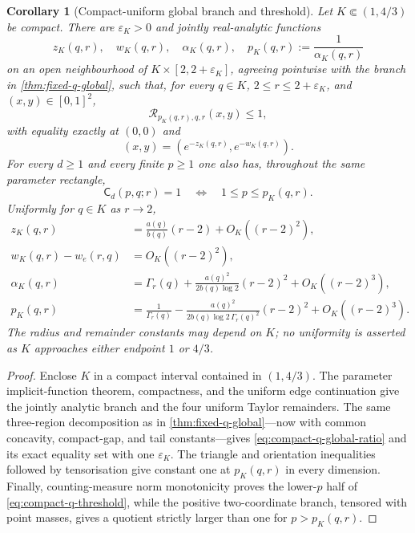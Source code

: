 \documentclass[11pt,reqno]{amsart}
\numberwithin{equation}{section}
\newtheorem{corollary}[corollary]{Corollary}
\theoremstyle{definition}
\theoremstyle{remark}
\newcommand{\Cpqr}{\mathsf C}
\begin{document}
\begin{corollary}[Compact-uniform global branch and threshold]
\label{cor:compact-q-global}
Let $K\Subset(1,4/3)$ be compact.  There are $\varepsilon_K>0$ and jointly
real-analytic functions
\[
  z_K(q,r),\quad w_K(q,r),\quad \alpha_K(q,r),\quad
  p_K(q,r):=\frac1{\alpha_K(q,r)}
\]
on an open neighbourhood of $K\times[2,2+\varepsilon_K]$, agreeing pointwise
with the branch in \cref{thm:fixed-q-global}, such that, for every $q\in K$,
$2\le r\le2+\varepsilon_K$, and $(x,y)\in[0,1]^2$,
\begin{equation}\label{eq:compact-q-global-ratio}
  \mathcal R_{p_K(q,r),q,r}(x,y)\le1,
\end{equation}
with equality exactly at $(0,0)$ and
\[
  (x,y)=\left(e^{-z_K(q,r)},e^{-w_K(q,r)}\right).
\]
For every $d\ge1$ and every finite $p\ge1$ one also has, throughout the same
parameter rectangle,
\begin{equation}\label{eq:compact-q-threshold}
  \Cpqr_d(p,q;r)=1
  \quad\Longleftrightarrow\quad
  1\le p\le p_K(q,r).
\end{equation}
Uniformly for $q\in K$ as $r\to2$,
\begin{align}
  z_K(q,r)
    &=\frac{a(q)}{b(q)}(r-2)+O_K((r-2)^2),\label{eq:compact-z-expansion}\\
  w_K(q,r)-w_e(r,q)
    &=O_K((r-2)^2),\label{eq:compact-w-expansion}\\
  \alpha_K(q,r)
    &=\Gamma_r(q)+\frac{a(q)^2}{2b(q)\log2}(r-2)^2
      +O_K((r-2)^3),\label{eq:compact-alpha-expansion}\\
  p_K(q,r)
    &=\frac1{\Gamma_r(q)}
      -\frac{a(q)^2}{2b(q)\log2\,\Gamma_r(q)^2}(r-2)^2
      +O_K((r-2)^3).\label{eq:compact-p-expansion}
\end{align}
The radius and remainder constants may depend on $K$; no uniformity is asserted
as $K$ approaches either endpoint $1$ or $4/3$.
\end{corollary}

\begin{proof}
Enclose $K$ in a compact interval contained in $(1,4/3)$.  The parameter
implicit-function theorem, compactness, and the uniform edge continuation give
the jointly analytic branch and the four uniform Taylor remainders.  The same
three-region decomposition as in \cref{thm:fixed-q-global}---now with common
concavity, compact-gap, and tail constants---gives
\eqref{eq:compact-q-global-ratio} and its exact equality set with one
$\varepsilon_K$.  The triangle and orientation inequalities followed by
tensorisation give constant one at $p_K(q,r)$ in every dimension.  Finally,
counting-measure norm monotonicity proves the lower-$p$ half of
\eqref{eq:compact-q-threshold}, while the positive two-coordinate branch,
tensored with point masses, gives a quotient strictly larger than one for
$p>p_K(q,r)$.
\end{proof}
\end{document}
